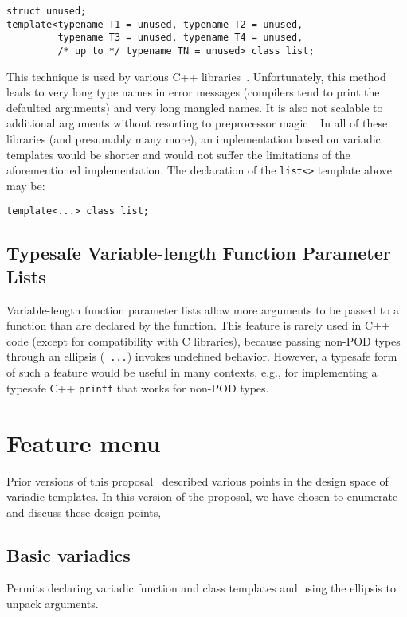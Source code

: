\documentclass{article}
\begin{document}
\begin{verbatim}
struct unused;
template<typename T1 = unused, typename T2 = unused, 
         typename T3 = unused, typename T4 = unused, 
         /* up to */ typename TN = unused> class list;
\end{verbatim}

This technique is used by various C++ libraries~\cite{Tuples01,
Jarvi02, Gurtovoy02}. Unfortunately, this method leads to very
long type names in error messages (compilers tend to print the
defaulted arguments) and very long mangled names. It is also not
scalable to additional arguments without resorting to preprocessor
magic~\cite{Preprocessor01}. In all of these libraries (and presumably
many more), an implementation based on variadic templates would be
shorter and would not suffer the limitations of the aforementioned
implementation. The declaration of the {\tt list<>} template above may
be:
\begin{verbatim}
template<...> class list;
\end{verbatim}

\subsection{Typesafe Variable-length Function Parameter Lists}
Variable-length function parameter lists allow more arguments to be
passed to a function than are declared by the function. This feature
is rarely used in C++ code (except for compatibility with C
libraries), because passing non-POD types through an ellipsis ({\tt
  ...}) invokes undefined behavior. However, a typesafe form of such a
feature would be useful in many contexts, e.g., for implementing a
typesafe C++ {\tt printf} that works for non-POD types.

\section{Feature menu}
Prior versions of this proposal~\cite{GJP03,GJP04a} described various
points in the design space of variadic templates. In this version of
the proposal, we have chosen to enumerate and discuss these design
points, 

\subsection{Basic variadics}
Permits declaring variadic function and class templates and using the
ellipsis to unpack arguments.
\end{document}
